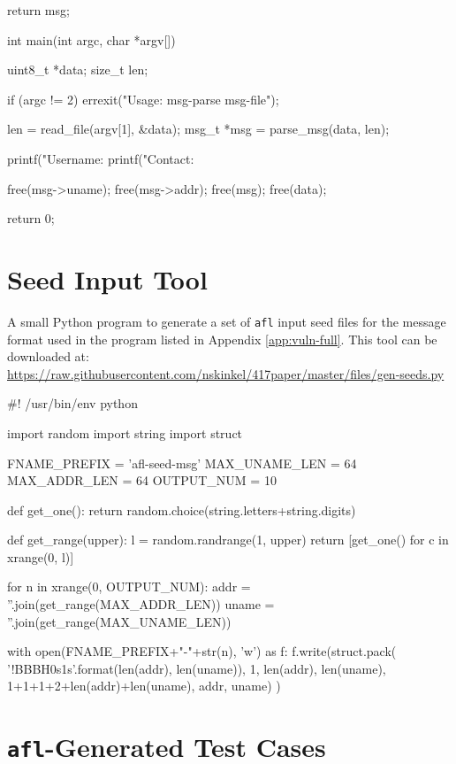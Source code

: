 \begin{appendices}
\begin{TCBlisting}[language={[ANSI]C},basicstyle=\scriptsize,caption={\mylstcaption}]
{    return msg;
}

int
main(int argc, char *argv[]) {
    uint8_t *data;
    size_t len;
    
    if (argc != 2) {
        errexit("Usage: msg-parse msg-file\n");
    }

    len = read_file(argv[1], &data);
    msg_t *msg = parse_msg(data, len);    

    printf("Username: %
    printf("Contact: %

    free(msg->uname);
    free(msg->addr);
    free(msg);
    free(data);

    return 0;
}
\end{TCBlisting}

\chapter{Seed Input Tool}
\label{app:vuln-seed}

A small Python program to generate a set of \texttt{afl} input seed files
for the message format used in the program listed in Appendix \ref{app:vuln-full}.
This tool can be downloaded at: \url{https://raw.githubusercontent.com/nskinkel/417paper/master/files/gen-seeds.py}

\renewcommand\mylstcaption{Seed File Generator}
\begin{TCBlisting}[language=Python,basicstyle=\scriptsize,caption={\mylstcaption}]
#! /usr/bin/env python

import random
import string
import struct


FNAME_PREFIX    = 'afl-seed-msg'
MAX_UNAME_LEN   = 64
MAX_ADDR_LEN    = 64
OUTPUT_NUM      = 10


def get_one():
    return random.choice(string.letters+string.digits)


def get_range(upper):
    l = random.randrange(1, upper)
    return [get_one() for c in xrange(0, l)]    
    

for n in xrange(0, OUTPUT_NUM):
    addr = ''.join(get_range(MAX_ADDR_LEN))
    uname = ''.join(get_range(MAX_UNAME_LEN))

    with open(FNAME_PREFIX+"-"+str(n), 'w') as f:
        f.write(struct.pack(
            '!BBBH{0}s{1}s'.format(len(addr), len(uname)),
            1, len(addr), len(uname),
            1+1+1+2+len(addr)+len(uname), addr, uname)
        )
\end{TCBlisting}

\chapter{\texttt{afl}-Generated Test Cases}
\label{app:test-cases}


\end{appendices}
